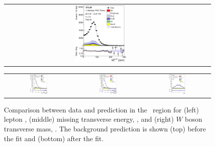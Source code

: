 \begin{figure}[tp]
\begin{tabular}{ccc}
  \includegraphics[width=0.27\textwidth]{Analysis/Figures_ttH/tesis_vars/postfit/WlepMT_5jetex2btagex.eps} \\
\end{tabular}
\caption{Comparison between data and prediction in the \fivetwo\ region for (left) lepton \pt,  (middle) missing transverse energy, \met, and (right)  $W$ boson transverse mass, \mtw. The background prediction is shown (top) before the fit and (bottom) after the fit.}
  \label{fig:vars1_fivetwo}
\vspace{0.5cm}
  \centering
  \begin{tabular}{ccc}
  \includegraphics[width=0.27\textwidth]{Analysis/Figures_ttH/tesis_vars/prefit/jet1_pt_5jetex2btagex.eps} &
  \includegraphics[width=0.27\textwidth]{Analysis/Figures_ttH/tesis_vars/prefit/bjet1_pt_5jetex2btagex.eps} &
  \includegraphics[width=0.27\textwidth]{Analysis/Figures_ttH/tesis_vars/prefit/lep_eta_5jetex2btagex.eps} \\

\end{tabular}
\end{figure}
